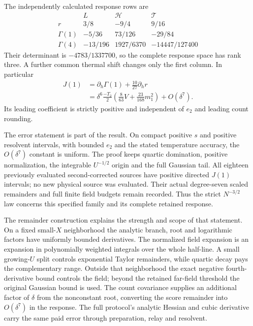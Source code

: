 The independently calculated response rows are
\begin{equation}
 \begin{array}{c|rrr}
 &L&\mathcal H&\mathcal T\\ \hline
 r&3/8&-9/4&9/16\\
 \Gamma(1)&-5/36&73/126&-29/84\\
 \Gamma(4)&-13/196&1927/6370&-14447/127400
 \end{array}
\end{equation}
Their determinant is $-4783/1337700$, so the complete response space has rank three. A further common thermal shift changes only the first column. In particular
\begin{align}
 J(1)&=\partial_h\Gamma(1)+\frac{10}{27}\partial_hr\\
 &=\delta^6\frac{-T_2}{2}
 \left(\frac8{63}V+\frac{23}{168}m_1^2\right)+O(\delta^7).
\end{align}
Its leading coefficient is strictly positive and independent of $e_2$ and leading count rounding.

The error statement is part of the result. On compact positive $s$ and positive resolvent intervals, with bounded $e_2$ and the stated temperature accuracy, the $O(\delta^7)$ constant is uniform. The proof keeps quartic domination, positive normalization, the integrable $U^{-1/2}$ origin and the full Gaussian tail. All eighteen previously evaluated second-corrected sources have positive directed $J(1)$ intervals; no new physical source was evaluated. Their actual degree-seven scaled remainders and full finite field budgets remain recorded. Thus the strict $N^{-3/2}$ law concerns this specified family and its complete retained response.

The remainder construction explains the strength and scope of that statement. On a fixed small-$X$ neighborhood the analytic branch, root and logarithmic factors have uniformly bounded derivatives. The normalized field expansion is an expansion in polynomially weighted integrals over the whole half-line. A small growing-$U$ split controls exponential Taylor remainders, while quartic decay pays the complementary range. Outside that neighborhood the exact negative fourth-derivative bound controls the field; beyond the retained far-field threshold the original Gaussian bound is used. The count covariance supplies an additional factor of $\delta$ from the nonconstant root, converting the score remainder into $O(\delta^7)$ in the response. The full protocol's analytic Hessian and cubic derivative carry the same paid error through preparation, relay and resolvent.

